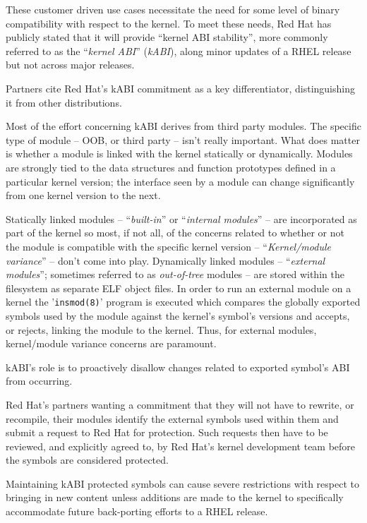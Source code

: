 \documentclass[10pt,oneside,english]{book}
\begin{document}
These customer driven use cases necessitate the need for some level
of binary compatibility with respect to the kernel. To meet these
needs, Red Hat has publicly stated that it will provide ``kernel
ABI stability'', more commonly referred to as the ``\emph{kernel
ABI}'' (\emph{kABI}), along minor updates of a RHEL release but not
across major releases.

Partners cite Red Hat's kABI commitment as a key differentiator, distinguishing
it from other distributions.

Most of the effort concerning kABI derives from third party modules.
The specific type of module -- OOB, or third party -- isn't really
important. What does matter is whether a module is linked with the
kernel statically or dynamically. Modules are strongly tied to the
data structures and function prototypes defined in a particular kernel
version; the interface seen by a module can change significantly from
one kernel version to the next.

Statically linked modules -- ``\emph{built-in}'' or ``\emph{internal
modules}'' -- are incorporated as part of the kernel so most, if
not all, of the concerns related to whether or not the module is compatible
with the specific kernel version -- ``\emph{Kernel/module variance}''
-- don't come into play. Dynamically linked modules -- ``\emph{external
modules}''; sometimes referred to as \emph{out-of-tree} modules --
are stored within the filesystem as separate ELF object files. In
order to run an external module on a kernel the '\texttt{insmod(8)}'
program is executed which compares the globally exported symbols used
by the module against the kernel's symbol's versions and accepts,
or rejects, linking the module to the kernel. Thus, for external modules,
kernel/module variance concerns are paramount.

kABI's role is to proactively disallow changes related to exported
symbol's ABI from occurring.

Red Hat's partners wanting a commitment that they will not have to
rewrite, or recompile, their modules identify the external symbols
used within them and submit a request to Red Hat for protection. Such
requests then have to be reviewed, and explicitly agreed to, by Red
Hat's kernel development team before the symbols are considered protected.

Maintaining kABI protected symbols can cause severe restrictions with
respect to bringing in new content unless additions are made to the
kernel to specifically accommodate future back-porting efforts to
a RHEL release.
\end{document}
